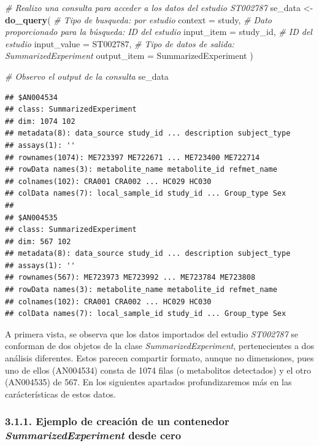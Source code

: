 \documentclass[
]{article}
\newenvironment{Shaded}{\begin{snugshade}}{\end{snugshade}}
\newcommand{\AttributeTok}[1]{\textcolor[rgb]{0.13,0.29,0.53}{#1}}
\newcommand{\CommentTok}[1]{\textcolor[rgb]{0.56,0.35,0.01}{\textit{#1}}}
\newcommand{\FunctionTok}[1]{\textcolor[rgb]{0.13,0.29,0.53}{\textbf{#1}}}
\newcommand{\NormalTok}[1]{#1}
\newcommand{\OtherTok}[1]{\textcolor[rgb]{0.56,0.35,0.01}{#1}}
\newcommand{\StringTok}[1]{\textcolor[rgb]{0.31,0.60,0.02}{#1}}
\begin{document}
\begin{Shaded}
\begin{Highlighting}[]
\CommentTok{\# Realizo una consulta para acceder a los datos del estudio ST002787}
\NormalTok{se\_data }\OtherTok{\textless{}{-}} \FunctionTok{do\_query}\NormalTok{(}
  \CommentTok{\# Tipo de busqueda: por estudio}
  \AttributeTok{context =} \StringTok{\textquotesingle{}study\textquotesingle{}}\NormalTok{,}
  \CommentTok{\# Dato proporcionado para la búsqueda: ID del estudio}
  \AttributeTok{input\_item =} \StringTok{\textquotesingle{}study\_id\textquotesingle{}}\NormalTok{,}
  \CommentTok{\# ID del estudio}
  \AttributeTok{input\_value =} \StringTok{\textquotesingle{}ST002787\textquotesingle{}}\NormalTok{,}
  \CommentTok{\# Tipo de datos de salida: SummarizedExperiment}
  \AttributeTok{output\_item =} \StringTok{\textquotesingle{}SummarizedExperiment\textquotesingle{}}
\NormalTok{)}

\CommentTok{\# Observo el output de la consulta}
\NormalTok{se\_data}
\end{Highlighting}
\end{Shaded}

\begin{verbatim}
## $AN004534
## class: SummarizedExperiment 
## dim: 1074 102 
## metadata(8): data_source study_id ... description subject_type
## assays(1): ''
## rownames(1074): ME723397 ME722671 ... ME723400 ME722714
## rowData names(3): metabolite_name metabolite_id refmet_name
## colnames(102): CRA001 CRA002 ... HC029 HC030
## colData names(7): local_sample_id study_id ... Group_type Sex
## 
## $AN004535
## class: SummarizedExperiment 
## dim: 567 102 
## metadata(8): data_source study_id ... description subject_type
## assays(1): ''
## rownames(567): ME723973 ME723992 ... ME723784 ME723808
## rowData names(3): metabolite_name metabolite_id refmet_name
## colnames(102): CRA001 CRA002 ... HC029 HC030
## colData names(7): local_sample_id study_id ... Group_type Sex
\end{verbatim}

A primera vista, se observa que los datos importados del estudio
\emph{ST002787} se conforman de dos objetos de la clase
\emph{SummarizedExperiment}, pertenecientes a dos análisis diferentes.
Estos parecen compartir formato, aunque no dimensiones, pues uno de
ellos (AN004534) consta de 1074 filas (o metabolitos detectados) y el
otro (AN004535) de 567. En los siguientes apartados profundizaremos más
en las carácterísticas de estos datos.

\subsubsection{\texorpdfstring{3.1.1. Ejemplo de creación de un
contenedor \emph{SummarizedExperiment} desde
cero}{3.1.1. Ejemplo de creación de un contenedor SummarizedExperiment desde cero}}\label{ejemplo-de-creaciuxf3n-de-un-contenedor-summarizedexperiment-desde-cero}
\end{document}
